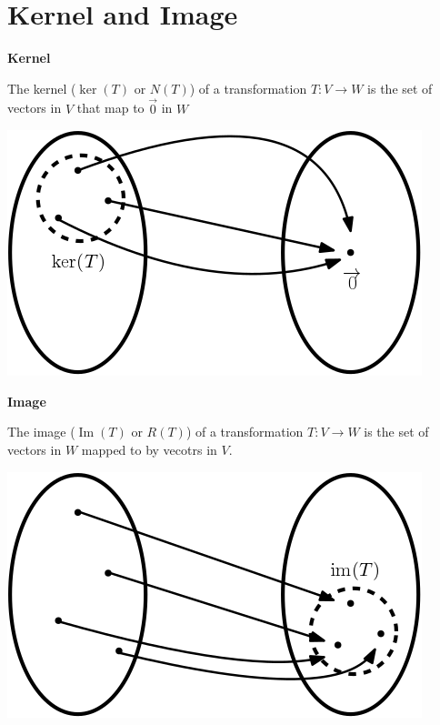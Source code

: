 \documentclass[11pt]{article}
\DeclareMathOperator{\ima}{Im}
\begin{document}
\section{Kernel and Image}
\label{sec:orgheadline13}
\begin{definition}
\textbf{Kernel}

The kernel (\(\ker(T)\) or \(N(T)\)) of a transformation \(T:V \rightarrow W\) is the set of vectors in \(V\) that map to \(\overrightarrow{0}\) in \(W\)

\includegraphics[width=.9\linewidth]{./kernel.png}
\end{definition}

\begin{definition}
\textbf{Image}

The image (\(\ima(T)\) or \(R(T)\)) of a transformation \(T:V \rightarrow W\) is the set of vectors in \(W\) mapped to by vecotrs in \(V\).

\includegraphics[width=.9\linewidth]{./image.png}
\end{definition}
\end{document}
